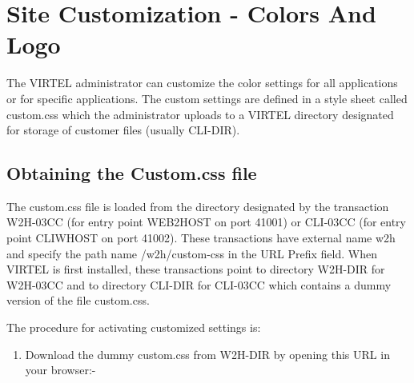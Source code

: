 \documentclass[letterpaper,10pt,english]{sphinxmanual}
\begin{document}


\section{Site Customization - Colors And Logo}
\label{\detokenize{User_Guide:site-customization-colors-and-logo}}
The VIRTEL administrator can customize the color settings for all applications or for specific applications. The custom
settings are defined in a style sheet called custom.css which the administrator uploads to a VIRTEL directory
designated for storage of customer files (usually CLI-DIR).


\subsection{Obtaining the Custom.css file}
\label{\detokenize{User_Guide:obtaining-the-custom-css-file}}
The custom.css file is loaded from the directory designated by the transaction W2H-03CC (for entry point WEB2HOST
on port 41001) or CLI-03CC (for entry point CLIWHOST on port 41002). These transactions have external name w2h
and specify the path name /w2h/custom-css in the URL Prefix field. When VIRTEL is first installed, these transactions
point to directory W2H-DIR for W2H-03CC and to directory CLI-DIR for CLI-03CC which contains a dummy version of
the file custom.css.

The procedure for activating customized settings is:
\begin{enumerate}
\item {} 
Download the dummy custom.css from W2H-DIR by opening this URL in your browser:-

\end{enumerate}

\begin{sphinxVerbatim}[commandchars=\\\{\}]
\end{sphinxVerbatim}
\end{document}
